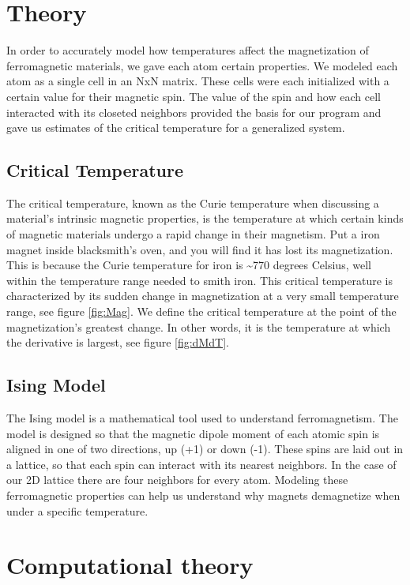 \documentclass[a4paper,twoside,12pt]{article}
\begin{document}
\section{Theory}
In order to accurately model how temperatures affect the magnetization of ferromagnetic materials, we gave each atom certain properties. We modeled each atom as a single cell in an NxN matrix. These cells were each initialized with a certain value for their magnetic spin. The value of the spin and how each cell interacted with its closeted neighbors provided the basis for our program and gave us estimates of the critical temperature for a generalized system.

\subsection{Critical Temperature}
The critical temperature, known as the Curie temperature when discussing a material's intrinsic magnetic properties, is the temperature at which certain kinds of magnetic materials undergo a rapid change in their magnetism. Put a iron magnet inside blacksmith's oven, and you will find it has lost its magnetization. This is because the Curie temperature for iron is \textasciitilde770 degrees Celsius, well within the temperature range needed to smith iron. This critical temperature is characterized by its sudden change in magnetization at a very small temperature range, see figure \ref{fig:Mag}. We define the critical temperature at the point of the magnetization's greatest change. In other words, it is the temperature at which the derivative is largest, see figure \ref{fig:dMdT}. 

\subsection{Ising Model}
The Ising model is a mathematical tool used to understand ferromagnetism. The model is designed so that the magnetic dipole moment of each atomic spin is aligned in one of two directions, up (+1) or down (-1). These spins are laid out in a lattice, so that each spin can interact with its nearest neighbors. In the case of our 2D lattice there are four neighbors for every atom. Modeling these ferromagnetic properties can help us understand why magnets demagnetize when under a specific temperature. 


\section{Computational theory}
\end{document}
